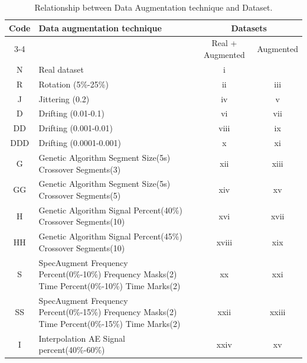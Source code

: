\documentclass[lettersize,journal]{IEEEtran}
\begin{document}
\begin{table}
\caption{Relationship between Data Augmentation technique and Dataset.}
\centering
\begin{tabular}{clcc}
\hline\hline
  \multirow{2}{*}{Code} & \multirow{2}{*}{Data augmentation technique} & \multicolumn{2}{c}{ Datasets } \\
  \cline{3-4}
 &  & 
  Real + Augmented
   & 
  Augmented
   \\
\hline
N & Real dataset & i & ~ \\
R & Rotation (5\%-25\%) & ii & iii \\
J & Jittering (0.2) & iv & v \\
D & Drifting (0.01-0.1) & vi & vii \\
DD & Drifting (0.001-0.01) & viii & ix \\
DDD & Drifting (0.0001-0.001) & x & xi \\
G & Genetic Algorithm Segment Size(5s) Crossover Segments(3) & xii & xiii \\
GG & Genetic Algorithm Segment Size(5s) Crossover Segments(5) & xiv & xv \\
H & Genetic Algorithm Signal Percent(40\%) Crossover Segments(10) & xvi & xvii \\
HH & Genetic Algorithm Signal Percent(45\%) Crossover Segments(10) & xviii & xix \\
S & SpecAugment Frequency Percent(0\%-10\%) Frequency Masks(2) Time Percent(0\%-10\%) Time Marks(2) & xx & xxi \\
SS & SpecAugment Frequency Percent(0\%-15\%) Frequency Masks(2) Time Percent(0\%-15\%) Time Marks(2) & xxii & xxiii \\
I & Interpolation AE Signal percent(40\%-60\%) & xxiv & xv \\
\hline
\end{tabular}
\label{table:code_dataset}
\end{table}
\end{document}
